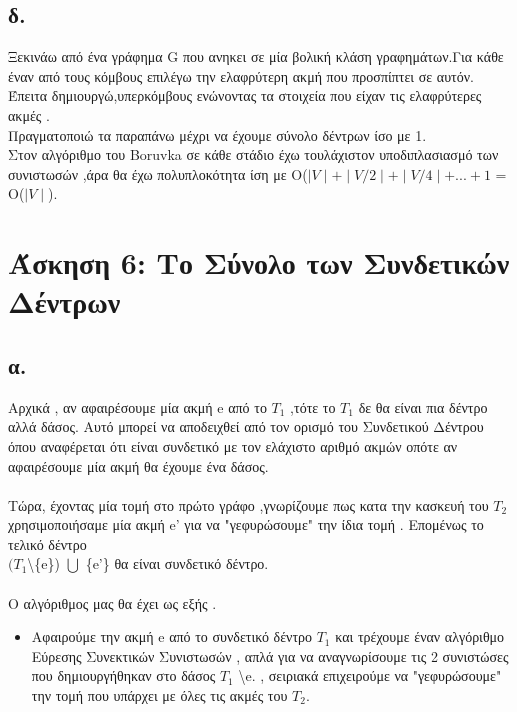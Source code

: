 \documentclass[12pt,a4paper]{article}
\begin{document}
\subsection*{δ.}
Ξεκινάω από ένα γράφημα G που ανηκει σε μία βολική κλάση γραφημάτων.Για κάθε έναν από τους κόμβους επιλέγω την ελαφρύτερη ακμή που προσπίπτει σε αυτόν. \\
Έπειτα δημιουργώ,υπερκόμβους ενώνοντας τα στοιχεία που είχαν τις ελαφρύτερες ακμές .\\
Πραγματοποιώ τα παραπάνω μέχρι να έχουμε σύνολο δέντρων ίσο με 1.\\
Στον αλγόριθμο του Boruvka σε κάθε στάδιο έχω τουλάχιστον υποδιπλασιασμό των συνιστωσών ,άρα θα έχω πολυπλοκότητα ίση με Ο($\mid V \mid+\mid V/2\mid+\mid V/4\mid+...+1$ = O($\mid V\mid$).
    
    
    
\section*{Άσκηση 6: Το Σύνολο των Συνδετικών Δέντρων}

\subsection*{α.}
Αρχικά , αν αφαιρέσουμε μία ακμή e από το $Τ_1$ ,τότε το $Τ_1$ δε θα είναι πια δέντρο αλλά δάσος. Αυτό μπορεί να αποδειχθεί από τον ορισμό του Συνδετικού Δέντρου όπου αναφέρεται ότι είναι συνδετικό με τον ελάχιστο αριθμό ακμών οπότε αν αφαιρέσουμε μία ακμή θα έχουμε ένα δάσος.\\\\
Τώρα, έχοντας μία τομή στο πρώτο γράφο ,γνωρίζουμε πως κατα την κασκευή του $Τ_2$ χρησιμοποιήσαμε μία ακμή e' για να "γεφυρώσουμε" την ίδια τομή . Επομένως το τελικό δέντρο\\ $(T_1 $\textbackslash \{e\}) $\bigcup$ \{e'\} θα είναι συνδετικό δέντρο.\\\\
Ο αλγόριθμος μας θα έχει ως εξής .
\begin{itemize}
    \item Αφαιρούμε την ακμή e από το συνδετικό δέντρο $Τ_1$ και τρέχουμε έναν αλγόριθμο Εύρεσης Συνεκτικών Συνιστωσών , απλά για να αναγνωρίσουμε τις 2 συνιστώσες που δημιουργήθηκαν στο δάσος $Τ_1$ \textbackslash e.
     , σειριακά επιχειρούμε να "γεφυρώσουμε" την τομή που υπάρχει με όλες τις ακμές του $Τ_2$.
\end{itemize}
\end{document}
